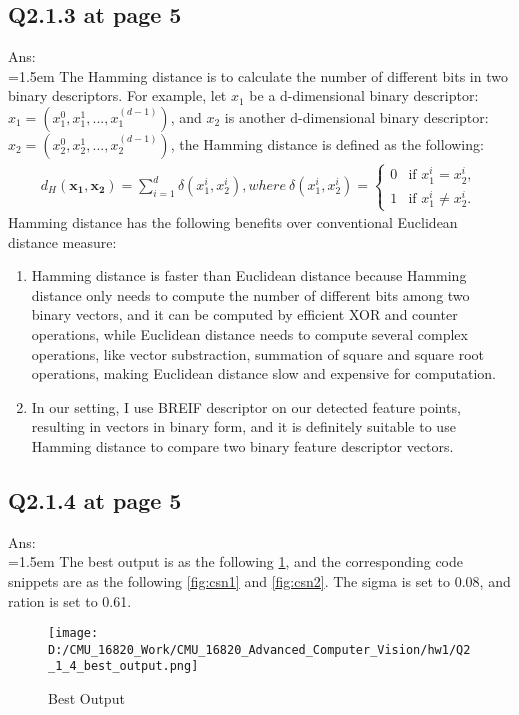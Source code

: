 \documentclass{article}
\begin{document}
	\subsection*{Q2.1.3 at page 5}
	Ans:\\
	\hangindent=1.5em \hspace{1.5em} The Hamming distance is to calculate the number of different bits in two binary descriptors. For example, let $x_1$ be a d-dimensional binary descriptor: $x_1 = (x_1^0, x_1^1, ..., x_1^{(d-1)})$, and $x_2$ is another d-dimensional binary descriptor: $x_2 = (x_2^0, x_2^1, ..., x_2^{(d-1)})$, the Hamming distance is defined as the following:
	\begin{eqnarray}
		d_H(\mathbf{x_1}, \mathbf{x_2}) = \sum_{i=1}^{d} \delta(x_1^i, x_2^i), where\ \delta(x_1^i, x_2^i) =
		\begin{cases}
			0 & \text{if } x_1^i = x_2^i, \\
			1 & \text{if } x_1^i \neq x_2^i.
		\end{cases}
	\end{eqnarray}
	Hamming distance has the following benefits over conventional Euclidean distance measure:
	\begin{enumerate}
		\item Hamming distance is faster than Euclidean distance because Hamming distance only needs to compute the number of different bits among two binary vectors, and it can be computed by efficient XOR and counter operations, while Euclidean distance needs to compute several complex operations, like vector substraction, summation of square and square root operations, making Euclidean distance slow and expensive for computation.
		\item In our setting, I use BREIF descriptor on our detected feature points, resulting in vectors in binary form, and it is definitely suitable to use Hamming distance to compare two binary feature descriptor vectors. 
	\end{enumerate}
	
	\newpage
	\subsection*{Q2.1.4 at page 5}
	Ans:\\
	\hangindent=1.5em \hspace{1.5em} The best output is as the following \ref{fig:best_output}, and the corresponding code snippets are as the following \ref{fig:csn1} and \ref{fig:csn2}. The sigma is set to 0.08, and ration is set to 0.61.
	\begin{figure}[h]		
		\centering
		\texttt{[image: D:/CMU\_16820\_Work/CMU\_16820\_Advanced\_Computer\_Vision/hw1/Q2\_1\_4\_best\_output.png]}  %
		\caption{Best Output}
		\label{fig:best_output}
	\end{figure}
\end{document}
